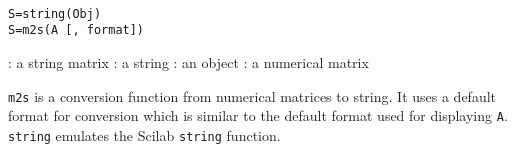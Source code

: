 
\begin{mandesc}
   \\
\end{mandesc}
\begin{calling_sequence}
\begin{verbatim}
S=string(Obj)
S=m2s(A [, format])
\end{verbatim}
\end{calling_sequence}

\begin{parameters}
  \begin{varlist}
    : a string matrix
    : a string 
    : an object 
    : a numerical matrix
  \end{varlist}
\end{parameters}
\begin{mandescription}
\verb+m2s+ is a conversion function from numerical matrices to string. 
It uses a default format for conversion which is similar to the default 
format used for displaying \verb+A+.
\verb+string+ emulates the Scilab \verb+string+ function.
\end{mandescription}

